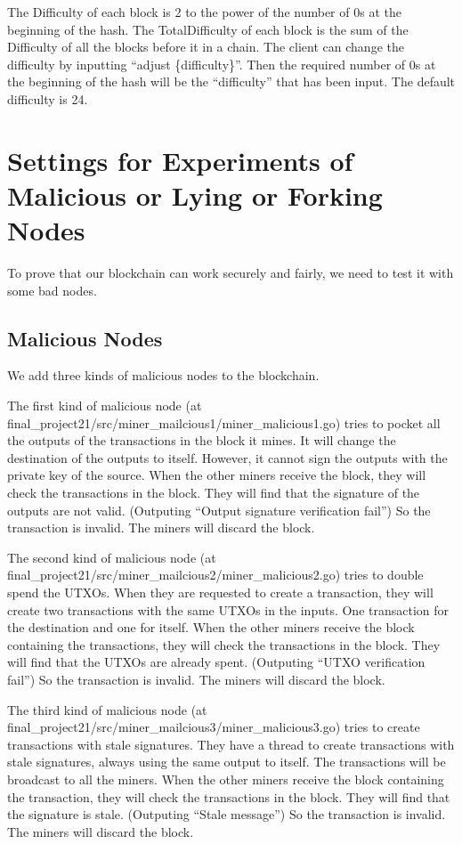 \documentclass[12pt]{article}
\begin{document}
The Difficulty of each block is 2 to the power of the number of 0s at the beginning of the hash. The TotalDifficulty of each block is the sum of the Difficulty of all the blocks before it in a chain.
The client can change the difficulty by inputting ``adjust \{difficulty\}''. Then the required number of 0s at the beginning of the hash will be the ``difficulty'' that has been input. The default difficulty is 24.

\section{Settings for Experiments of Malicious or Lying or Forking Nodes}
To prove that our blockchain can work securely and fairly, we need to test it with some bad nodes.

\subsection{Malicious Nodes}
We add three kinds of malicious nodes to the blockchain.

The first kind of malicious node (at final\_project21/src/miner\_mailcious1/miner\_malicious1.go) tries to pocket all the outputs of the transactions in the block it mines.
It will change the destination of the outputs to itself. However, it cannot sign the outputs with the private key of the source.
When the other miners receive the block, they will check the transactions in the block. They will find that the signature of the outputs are not valid. (Outputing ``Output signature verification fail'') So the transaction is invalid. The miners will discard the block.

The second kind of malicious node (at final\_project21/src/miner\_mailcious2/miner\_malicious2.go) tries to double spend the UTXOs.
When they are requested to create a transaction, they will create two transactions with the same UTXOs in the inputs. One transaction for the destination and one for itself.
When the other miners receive the block containing the transactions, they will check the transactions in the block. They will find that the UTXOs are already spent. (Outputing ``UTXO verification fail'') So the transaction is invalid. The miners will discard the block.

The third kind of malicious node (at final\_project21/src/miner\_mailcious3/miner\_malicious3.go) tries to create transactions with stale signatures.
They have a thread to create transactions with stale signatures, always using the same output to itself. The transactions will be broadcast to all the miners.
When the other miners receive the block containing the transaction, they will check the transactions in the block. They will find that the signature is stale. (Outputing ``Stale message'') So the transaction is invalid. The miners will discard the block.
\end{document}
